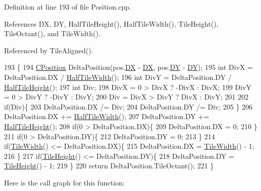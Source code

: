 Definition at line 193 of file Position.\+cpp.



References DX, DY, Half\+Tile\+Height(), Half\+Tile\+Width(), Tile\+Height(), Tile\+Octant(), and Tile\+Width().



Referenced by Tile\+Aligned().


\begin{DoxyCode}
193                                                            \{
194     \hyperlink{classCPosition}{CPosition} DeltaPosition(pos.\hyperlink{classCPosition_a28445f9b872169715919074d82044eda}{DX} - \hyperlink{classCPosition_a28445f9b872169715919074d82044eda}{DX}, pos.\hyperlink{classCPosition_a84139c9e8eb547e7cf3cb851739943a4}{DY} - \hyperlink{classCPosition_a84139c9e8eb547e7cf3cb851739943a4}{DY});
195     \textcolor{keywordtype}{int} DivX = DeltaPosition.DX / \hyperlink{classCPosition_a4b799a0fb78ddd8bbd8548980e2458af}{HalfTileWidth}();
196     \textcolor{keywordtype}{int} DivY = DeltaPosition.DY / \hyperlink{classCPosition_a5e371060b1aa0d3d3c5df1e353e0e5fd}{HalfTileHeight}();
197     \textcolor{keywordtype}{int} Div;
198     DivX = 0 > DivX ? -DivX : DivX;
199     DivY = 0 > DivY ? -DivY : DivY;
200     Div = DivX > DivY ? DivX : DivY;
201 
202     \textcolor{keywordflow}{if}(Div)\{
203         DeltaPosition.DX /= Div;
204         DeltaPosition.DY /= Div;
205     \}
206     DeltaPosition.DX += \hyperlink{classCPosition_a4b799a0fb78ddd8bbd8548980e2458af}{HalfTileWidth}();
207     DeltaPosition.DY += \hyperlink{classCPosition_a5e371060b1aa0d3d3c5df1e353e0e5fd}{HalfTileHeight}();
208     \textcolor{keywordflow}{if}(0 > DeltaPosition.DX)\{
209         DeltaPosition.DX = 0;
210     \}
211     \textcolor{keywordflow}{if}(0 > DeltaPosition.DY)\{
212         DeltaPosition.DY = 0;
213     \}
214     \textcolor{keywordflow}{if}(\hyperlink{classCPosition_a27a7a8b9a5541da0aa8d97d785650fb8}{TileWidth}() <= DeltaPosition.DX)\{
215         DeltaPosition.DX = \hyperlink{classCPosition_a27a7a8b9a5541da0aa8d97d785650fb8}{TileWidth}() - 1;
216     \}
217     \textcolor{keywordflow}{if}(\hyperlink{classCPosition_ac4f0edd9c9632f1bdca981ef5d9b71e5}{TileHeight}() <= DeltaPosition.DY)\{
218         DeltaPosition.DY = \hyperlink{classCPosition_ac4f0edd9c9632f1bdca981ef5d9b71e5}{TileHeight}() - 1;
219     \}
220     \textcolor{keywordflow}{return} DeltaPosition.TileOctant();
221 \}
\end{DoxyCode}
Here is the call graph for this function\+:\nopagebreak
